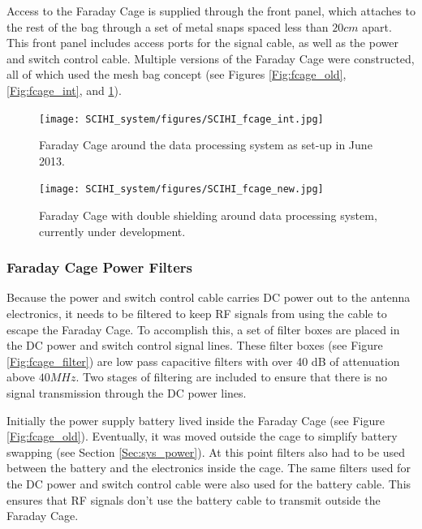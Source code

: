 Access to the Faraday Cage is supplied through the front panel, which attaches to the rest of the bag through a set of metal snaps spaced less than $20 cm$ apart. This front panel includes access ports for the signal cable, as well as the power and switch control cable. Multiple versions of the Faraday Cage were constructed, all of which used the mesh bag concept (see Figures \ref{Fig:fcage_old}, \ref{Fig:fcage_int}, and \ref{Fig:fcage_new}). 

\begin{figure}[htb]
\centering
\begin{minipage}[b]{0.44\textwidth}
\centering
\texttt{[image: SCIHI\_system/figures/SCIHI\_fcage\_int.jpg]}
\caption{Faraday Cage around the data processing system as set-up in June 2013.}
\label{Fig:fcage_int}
\end{minipage}%
\begin{minipage}[b]{0.02\textwidth}
\hspace{1cm}
\end{minipage}%
\begin{minipage}[b]{0.50\textwidth}
\centering
\texttt{[image: SCIHI\_system/figures/SCIHI\_fcage\_new.jpg]}
\caption{Faraday Cage with double shielding around data processing system, currently under development.}
\label{Fig:fcage_new}
\end{minipage}
\end{figure}

\subsubsection{Faraday Cage Power Filters}

Because the power and switch control cable carries DC power out to the antenna electronics, it needs to be filtered to keep RF signals from using the cable to escape the Faraday Cage. To accomplish this, a set of filter boxes are placed in the DC power and switch control signal lines. These filter boxes (see Figure \ref{Fig:fcage_filter}) are low pass capacitive filters with over 40 dB of attenuation above $40 MHz$. Two stages of filtering are included to ensure that there is no signal transmission through the DC power lines. 

Initially the power supply battery lived inside the Faraday Cage (see Figure \ref{Fig:fcage_old}). Eventually, it was moved outside the cage to simplify battery swapping (see Section \ref{Sec:sys_power}). At this point filters also had to be used between the battery and the electronics inside the cage. The same filters used for the DC power and switch control cable were also used for the battery cable. This ensures that RF signals don't use the battery cable to transmit outside the Faraday Cage.  

